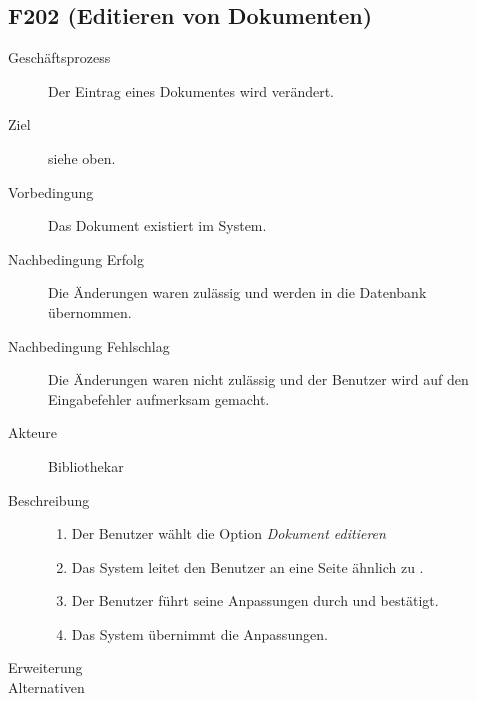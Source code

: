 \subsection{F202 (Editieren von Dokumenten)}
\begin{description}
  \item[Geschäftsprozess]Der Eintrag eines Dokumentes wird verändert.
  \item[Ziel]siehe oben.
  \item[Vorbedingung]Das Dokument existiert im System.
  \item[Nachbedingung Erfolg]Die Änderungen waren zulässig und werden in die Datenbank übernommen.
  \item[Nachbedingung Fehlschlag]Die Änderungen waren nicht zulässig und der Benutzer wird auf den Eingabefehler aufmerksam gemacht.
  \item[Akteure]Bibliothekar
  \item[Beschreibung]\hfill
    \begin{enumerate}
      \item Der Benutzer wählt die Option \emph{Dokument editieren}
      \item Das System leitet den Benutzer an eine Seite ähnlich zu .
      \item Der Benutzer führt seine Anpassungen durch und bestätigt.
      \item Das System übernimmt die Anpassungen.
    \end{enumerate}
  \item[Erweiterung]
  \item[Alternativen]
\end{description}

